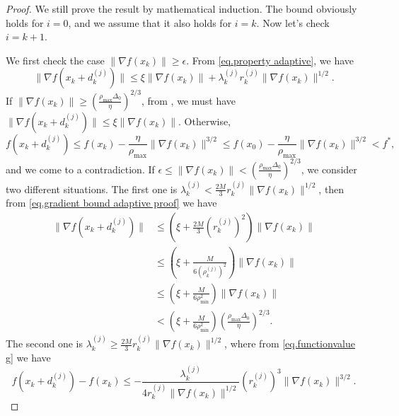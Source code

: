 \begin{proof}
        We still prove the result by mathematical induction. The bound obviously holds for $i=0$, and we assume that it also holds for $i=k$. Now let's check $i=k+1$.

        We first check the case $\|\nabla f(x_k)\|\geq \epsilon$. From \eqref{eq.property adaptive}, we have
        \begin{equation}
            \label{eq.gradient bound adaptive proof}
            \| \nabla f(x_k+d_k^{(j)})\| \leq \xi \|\nabla f(x_k)\| + \lambda_k^{(j)} r_k^{(j)} \|\nabla f(x_k)\|^{1/2}.
        \end{equation}
        If $\|\nabla f(x_k)\| \geq \left (\frac{\rho_{\max}\Delta_0}{\eta}\right)^{2/3}$, from , we must have $\|\nabla f(x_k+d_k^{(j)})\| \leq \xi\|\nabla f(x_k)\|$. Otherwise,   
\begin{equation*}
    f(x_k+d_k^{(j)})\leq f(x_k)-\frac{\eta}{\rho_{\max}} \|\nabla f(x_k)\|^{3/2} \leq f(x_0)-\frac{\eta}{\rho_{\max}}\|\nabla f(x_k)\|^{3/2} <f^*,
\end{equation*}
and we come to a contradiction.
        If $\epsilon \leq \|\nabla f(x_k)\| <\left (\frac{\rho_{\max}\Delta_0}{\eta}\right)^{2/3}$,  we consider two different situations. The first one is $\lambda_k^{(j)} < \frac{2M}{3} r_k^{(j)}\|\nabla f(x_k)\|^{1/2}$, then from \eqref{eq.gradient bound adaptive proof} we have 
        \begin{equation*}
        \begin{aligned}
            \| \nabla f(x_k+d_k^{(j)})\| &\leq \left(\xi+\frac{2M}{3}(r_k^{(j)})^2\right) \|\nabla f(x_k)\| \\
            &\leq \left(\xi+\frac{M}{6(\rho_k^{(j)})^2}\right) \|\nabla f(x_k)\|\\
            &\leq \left(\xi+\frac{M}{6\rho_{\min}^2}\right) \|\nabla f(x_k)\|\\
            &<\left(\xi+\frac{M}{6\rho_{\min}^2}\right)\left (\frac{\rho_{\max}\Delta_0}{\eta}\right)^{2/3}.
        \end{aligned}
        \end{equation*}
        The second one is $\lambda_k^{(j)} \geq \frac{2M}{3} r_k^{(j)}\|\nabla f(x_k)\|^{1/2}$, where from \eqref{eq.functionvalue g} we have
        \begin{equation*}
            f(x_k+d_k^{(j)}) - f(x_k)\leq - \frac{\lambda_k^{(j)}}{4r_k^{(j)}\|\nabla f(x_k)\|^{1/2}} (r_k^{(j)})^3 \|\nabla f(x_k)\|^{3/2}.
        \end{equation*}

\end{proof}
